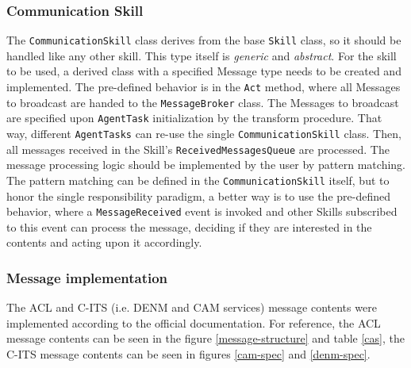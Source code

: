\documentclass[0main.tex]{subfiles}
\begin{document}
\subsubsection{Communication Skill}

The \texttt{CommunicationSkill} class derives from the base \texttt{Skill} class, so it should
be handled like any other skill. This type itself is \emph{generic} and \emph{abstract}. For
the skill to be used, a derived class with a specified Message type needs to be created and
implemented. The pre-defined behavior is in the \texttt{Act} method, where all Messages to
broadcast are handed to the \texttt{MessageBroker} class.  The Messages to broadcast are
specified upon \texttt{AgentTask} initialization by the transform procedure. That way,
different \texttt{AgentTasks} can re-use the single \texttt{CommunicationSkill} class.  Then,
all messages received in the Skill's \texttt{ReceivedMessagesQueue} are processed. The message
processing logic should be implemented by the user by pattern matching. The pattern matching
can be defined in the \texttt{CommunicationSkill} itself, but to honor the single
responsibility paradigm, a better way is to use the pre-defined behavior, where a
\texttt{MessageReceived} event is invoked and other Skills subscribed to this event can process
the message, deciding if they are interested in the contents and acting upon it accordingly. 

\subsubsection{Message implementation}

The ACL and C-ITS (i.e. DENM and CAM services) message contents were implemented according to 
the official documentation. For reference, the ACL message contents can be seen in the figure
\ref{message-structure} and table \ref{cas}, the C-ITS message contents can be seen 
in figures \ref{cam-spec} and \ref{denm-spec}.
\end{document}
